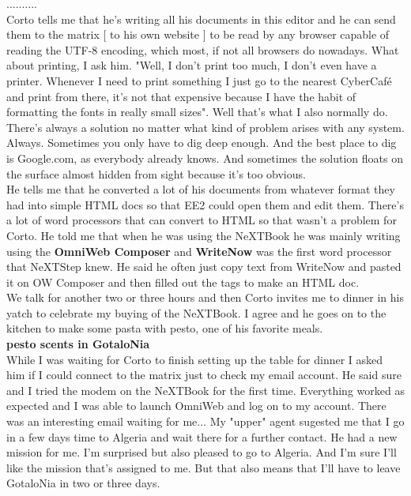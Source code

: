 \documentclass[11pt,twoside,a4paper]{book}
\begin{document}
\begin{multicols*}{2}

.......... ~\\
    Corto tells me that he's writing all his documents in this editor and he can send them to the matrix [ to his own website ] to be read by any browser capable of reading the UTF-8 encoding, which most, if not all browsers do nowadays. What about printing, I ask him. "Well, I don't print too much, I don't even have a printer. Whenever I need to print something I just go to the nearest CyberCaf{\'e} and print from there, it's not that expensive because I have the habit of formatting the fonts in really small sizes". Well that's what I also normally do. There's always a solution no matter what kind of problem arises with any system. Always. Sometimes you only have to dig deep enough. And the best place to dig is Google.com, as everybody already knows. And sometimes the solution floats on the surface almost hidden from sight because it's too obvious. ~\\

    He tells me that he converted a lot of his documents from whatever format they had into simple HTML docs so that EE2 could open them and edit them. There's a lot of word processors that can convert to HTML so that wasn't a problem for Corto. He told me that when he was using the NeXTBook he was mainly writing using the \textbf{OmniWeb Composer} and \textbf{WriteNow} was the first word processor that NeXTStep knew. He said he often just copy text from WriteNow and pasted it on OW Composer and then filled out the tags to make an HTML doc. ~\\

    We talk for another two or three hours and then Corto invites me to dinner in his yatch to celebrate my buying of the NeXTBook. I agree and he goes on to the kitchen to make some pasta with pesto, one of his favorite meals. ~\\

    \textbf{pesto scents in GotaloNia} ~\\

    While I was waiting for Corto to finish setting up the table for dinner I asked him if I could connect to the matrix just to check my email account. He said sure and I tried the modem on the NeXTBook for the first time. Everything worked as expected and I was able to launch OmniWeb and log on to my account. There was an interesting email waiting for me... My "upper" agent sugested me that I go in a few days time to Algeria and wait there for a further contact. He had a new mission for me. I'm surprised but also pleased to go to Algeria. And I'm sure I'll like the mission that's assigned to me. But that also means that I'll have to leave GotaloNia in two or three days. ~\\


\end{multicols*}
\end{document}
